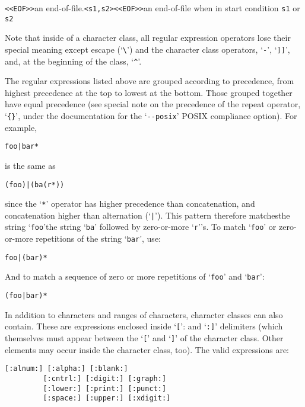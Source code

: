 \documentclass[openany,oneside]{book}
\begin{document}
\verb`<<EOF>>`an end-of-file.\verb`<s1,s2><<EOF>>`an end-of-file when in start condition \verb`s1` or \verb`s2` 

Note that inside of a character class, all regular expression operators
lose their special meaning except escape (‘\verb`\`’) and the character class
operators, ‘\verb`-`’, ‘\verb`]]`’, and, at the beginning of the class, ‘\verb`^`’.

The regular expressions listed above are grouped according to
precedence, from highest precedence at the top to lowest at the bottom. 
Those grouped together have equal precedence (see special note on the
precedence of the repeat operator, ‘\verb`{}`’, under the documentation
for the ‘\verb`--posix`’ POSIX compliance option).  For example,


\begin{verbatim}
foo|bar*
\end{verbatim}


is the same as
\begin{verbatim}
(foo)|(ba(r*))
\end{verbatim}


since the ‘\verb`*`’ operator has higher precedence than concatenation,
and concatenation higher than alternation (‘\verb`|`’).  This pattern
therefore matchesthe string ‘\verb`foo`’the
string ‘\verb`ba`’ followed by zero-or-more ‘\verb`r`’'s.  To match
‘\verb`foo`’ or zero-or-more repetitions of the string ‘\verb`bar`’, use:
\begin{verbatim}
foo|(bar)*
\end{verbatim}


And to match a sequence of zero or more repetitions of ‘\verb`foo`’ and
‘\verb`bar`’:


\begin{verbatim}
(foo|bar)*
\end{verbatim}


In addition to characters and ranges of characters, character classes
can also contain.  These are
expressions enclosed inside ‘\verb`[`’: and ‘\verb`:]`’ delimiters (which
themselves must appear between the ‘\verb`[`’ and ‘\verb`]`’ of the
character class. Other elements may occur inside the character class,
too).  The valid expressions are:


\begin{verbatim}
[:alnum:] [:alpha:] [:blank:]
         [:cntrl:] [:digit:] [:graph:]
         [:lower:] [:print:] [:punct:]
         [:space:] [:upper:] [:xdigit:]
\end{verbatim}
\end{document}
